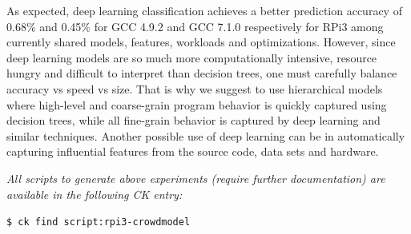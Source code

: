 As expected, deep learning classification achieves a better prediction accuracy of 0.68\%
and 0.45\% for GCC 4.9.2 and GCC 7.1.0 respectively for RPi3 among currently shared models, 
features, workloads and optimizations.
%
However, since deep learning models are so much more computationally intensive, resource hungry
and difficult to interpret than decision trees, one must carefully balance accuracy vs speed vs size.
%
That is why we suggest to use hierarchical models where
high-level and coarse-grain program behavior is quickly captured 
using decision trees, while all fine-grain behavior is captured 
by deep learning and similar techniques.
%
Another possible use of deep learning can be in automatically capturing
influential features from the source code, data sets and hardware.

\textit{All scripts to generate above experiments (require further documentation)
are available in the following CK entry:}

\begin{flushleft}
\texttt{\$ ck find script:rpi3-crowdmodel}
\end{flushleft}
